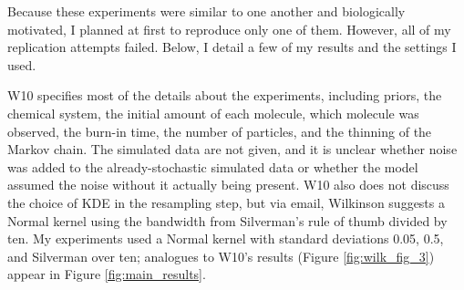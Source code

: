 \documentclass{article}
\begin{document}
Because these experiments were similar to one another and biologically motivated, I planned at first to reproduce only one of them. However, all of my replication attempts failed. Below, I detail a few of my results and the settings I used.

W10 specifies most of the details about the experiments, including priors, the chemical system, the initial amount of each molecule, which molecule was observed, the burn-in time, the number of particles, and the thinning of the Markov chain. The simulated data are not given, and it is unclear whether noise was added to the already-stochastic simulated data or whether the model assumed the noise without it actually being present. W10 also does not discuss the choice of KDE in the resampling step, but via email, Wilkinson suggests a Normal kernel using the bandwidth from Silverman's rule of thumb \cite{silverman1986density} divided by ten. My experiments used a Normal kernel with standard deviations 0.05, 0.5, and Silverman over ten; analogues to W10's results (Figure \ref{fig:wilk_fig_3}) appear in Figure \ref{fig:main_results}.
\end{document}
